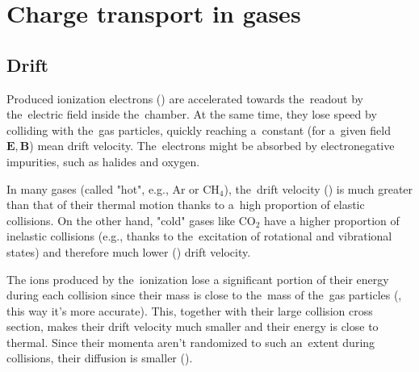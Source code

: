 	
	\section{Charge transport in gases}
		\subsection{Drift}
			Produced ionization electrons () are accelerated towards the~readout by the~electric field inside the~chamber. At the same time, they lose speed by colliding with the~gas particles, quickly reaching a~constant (for a~given field $\mathbf{E}, \mathbf{B}$) mean drift velocity. The~electrons might be absorbed by electronegative impurities, such as halides and oxygen.
			
			In many gases (called "hot", e.g., Ar or CH$_4$), the~drift velocity () is much greater than that of their thermal motion thanks to a~high proportion of elastic collisions. On the other hand, "cold" gases like CO$_2$ have a higher proportion of inelastic collisions (e.g., thanks to the~excitation of rotational and vibrational states) and therefore much lower () drift velocity.
			
			The ions produced by the~ionization lose a significant portion of their energy during each collision since their mass is close to the~mass of the~gas particles (, this way it's more accurate). This, together with their large collision cross section, makes their drift velocity much smaller and their energy is close to thermal. Since their momenta aren't randomized to such an~extent during collisions, their diffusion is smaller ().
			
